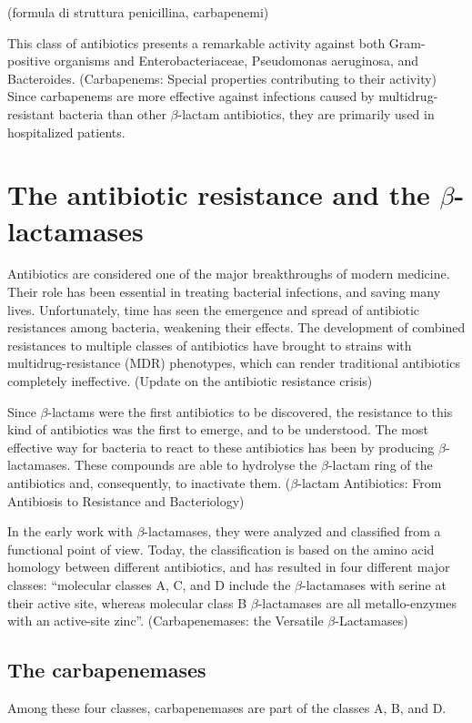 \documentclass[11pt]{report}
\begin{document}
(formula di struttura penicillina, carbapenemi)

This class of antibiotics presents a remarkable activity against both Gram-positive organisms and Enterobacteriaceae, Pseudomonas aeruginosa, and Bacteroides.
(Carbapenems: Special properties contributing to their activity)
Since carbapenems are more effective against infections caused by multidrug-resistant bacteria than other $\beta$-lactam antibiotics, they are primarily used in hospitalized patients.

\chapter{The antibiotic resistance and the $\beta$-lactamases}

Antibiotics are considered one of the major breakthroughs of modern medicine. Their role has been essential in treating bacterial infections, and saving many lives. Unfortunately, time has seen the emergence and spread of antibiotic resistances among bacteria, weakening their effects. The development of combined resistances to multiple classes of antibiotics have brought to strains with multidrug-resistance (MDR) phenotypes, which can render traditional antibiotics completely ineffective.
(Update on the antibiotic resistance crisis)

Since $\beta$-lactams were the first antibiotics to be discovered, the resistance to this kind of antibiotics was the first to emerge, and to be understood. The most effective way for bacteria to react to these antibiotics has been by producing $\beta$-lactamases. These compounds are able to hydrolyse the $\beta$-lactam ring of the antibiotics and, consequently, to inactivate them.
($\beta$-lactam Antibiotics: From Antibiosis to Resistance and Bacteriology)

In the early work with $\beta$-lactamases, they were analyzed and classified from a functional point of view. Today, the classification is based on the amino acid homology between different antibiotics, and has resulted in four different major classes: “molecular classes A, C, and D include the $\beta$-lactamases with serine at their active site, whereas molecular class B $\beta$-lactamases are all metallo-enzymes with an active-site zinc”.
(Carbapenemases: the Versatile $\beta$-Lactamases)

\section{The carbapenemases}
Among these four classes, carbapenemases are part of the classes A, B, and D.
\end{document}
